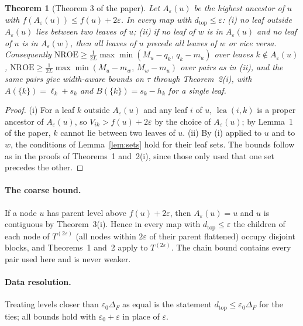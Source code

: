 \documentclass[10pt]{article}
\newtheorem{theorem}{Theorem}
\newcommand{\dtop}{d_{\mathrm{top}}}
\newcommand{\lca}{\operatorname{lca}}
\newcommand{\nroe}{\mathrm{NROE}}
\begin{document}
\begin{theorem}[Theorem 3 of the paper]
Let $A_\varepsilon(u)$ be the highest ancestor of $u$ with $f(A_\varepsilon(u))\le f(u)+2\varepsilon$. In every map with $\dtop\le\varepsilon$: (i) no leaf outside $A_\varepsilon(u)$ lies between two leaves of $u$; (ii) if no leaf of $w$ is in $A_\varepsilon(u)$ and no leaf of $u$ is in $A_\varepsilon(w)$, then all leaves of $u$ precede all leaves of $w$ or vice versa. Consequently $\nroe\ge\frac1{2L}\max\min(M_u-q_k,\,q_k-m_u)$ over leaves $k\notin A_\varepsilon(u)$, $\nroe\ge\frac1{2L}\max\min(M_u-m_w,\,M_w-m_u)$ over pairs as in (ii), and the same pairs give width-aware bounds on $\tau$ through Theorem~2(i), with $A(\{k\})=\ell_k+s_k$ and $B(\{k\})=s_k-h_k$ for a single leaf.
\end{theorem}
\begin{proof}
(i) For a leaf $k$ outside $A_\varepsilon(u)$ and any leaf $i$ of $u$, $\lca(i,k)$ is a proper ancestor of $A_\varepsilon(u)$, so $V_{ik}>f(u)+2\varepsilon$ by the choice of $A_\varepsilon(u)$; by Lemma~1 of the paper, $k$ cannot lie between two leaves of $u$. (ii) By (i) applied to $u$ and to $w$, the conditions of Lemma~\ref{lem:sets} hold for their leaf sets. The bounds follow as in the proofs of Theorems~1 and~2(i), since those only used that one set precedes the other.
\end{proof}

\paragraph{The coarse bound.} If a node $u$ has parent level above $f(u)+2\varepsilon$, then $A_\varepsilon(u)=u$ and $u$ is contiguous by Theorem~3(i). Hence in every map with $\dtop\le\varepsilon$ the children of each node of $T^{(2\varepsilon)}$ (all nodes within $2\varepsilon$ of their parent flattened) occupy disjoint blocks, and Theorems~1 and~2 apply to $T^{(2\varepsilon)}$. The chain bound contains every pair used here and is never weaker.

\paragraph{Data resolution.} Treating levels closer than $\varepsilon_0\Delta_F$ as equal is the statement $\dtop\le\varepsilon_0\Delta_F$ for the ties; all bounds hold with $\varepsilon_0+\varepsilon$ in place of $\varepsilon$.
\end{document}
